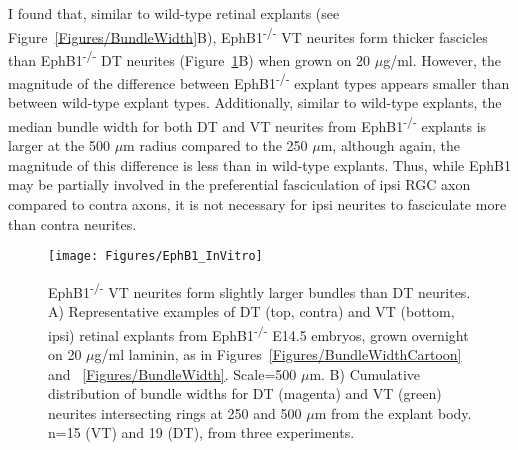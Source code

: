 I found that, similar to wild-type retinal explants (see Figure~\ref{Figures/BundleWidth}B), EphB1\textsuperscript{-/-} VT neurites form thicker fascicles than EphB1\textsuperscript{-/-} DT neurites (Figure~\ref{EphB1InVitro}B) when grown on 20 $\mu$g/ml.
However, the magnitude of the difference between EphB1\textsuperscript{-/-} explant types appears smaller than between wild-type explant types. 
Additionally, similar to wild-type explants, the median bundle width for both DT and VT neurites from EphB1\textsuperscript{-/-} explants is larger at the 500 $\mu$m radius compared to the 250 $\mu$m, although again, the magnitude of this difference is less than in wild-type explants.
Thus, while EphB1 may be partially involved in the preferential fasciculation of ipsi RGC axon compared to contra axons, it is not necessary for ipsi neurites to fasciculate more than contra neurites.
\begin{figure}[hbtp]
    \begin{center}
        \texttt{[image: Figures/EphB1\_InVitro]}
        \caption[EphB1\textsuperscript{-/-} VT neurites form slightly larger bundles than DT neurites.]
        {EphB1\textsuperscript{-/-} VT neurites form slightly larger bundles than DT neurites.
        A) Representative examples of DT (top, contra) and VT (bottom, ipsi) retinal explants from EphB1\textsuperscript{-/-} E14.5 embryos, grown overnight on 20 $\mu$g/ml laminin, as in Figures~\ref{Figures/BundleWidthCartoon} and ~\ref{Figures/BundleWidth}.
        Scale=500 $\mu$m.
        B) Cumulative distribution of bundle widths for DT (magenta) and VT (green) neurites intersecting rings at 250 and 500 $\mu$m from the explant body.
        n=15 (VT) and 19 (DT), from three experiments.
        }
        \label{EphB1InVitro}
    \end{center}
\end{figure}
